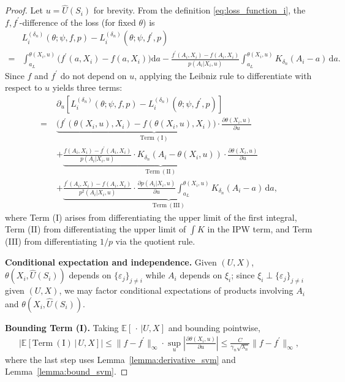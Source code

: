\documentclass[12pt]{article}
\newcommand{\E}{\mathbb{E}}
\begin{document}
\begin{proof}
Let $u = \widehat{U}(S_i)$ for brevity.  From the definition \eqref{eq:loss_function_i}, the $f,f^\prime$-difference of the loss (for fixed $\theta$) is
\begin{align*}
&L^{(\delta_n)}_i(\theta;\psi,f,p) - L^{(\delta_n)}_i(\theta;\psi,f^\prime,p)\\
= &\int_{a_L}^{\theta(X_i,u)}\bigl(f^\prime(a,X_i)-f(a,X_i)\bigr)\mathrm{d}a
- \frac{f^\prime(A_i,X_i)-f(A_i,X_i)}{p(A_i|X_i,u)}\int_{a_L}^{\theta(X_i,u)}K_{\delta_n}(A_i-a)\,\mathrm{d}a.
\end{align*}
Since $f$ and $f^\prime$ do not depend on $u$, applying the Leibniz rule to differentiate with respect to $u$ yields three terms:
\begin{align*}
&\partial_u\!\left[L^{(\delta_n)}_i(\theta;\psi,f,p) - L^{(\delta_n)}_i(\theta;\psi,f^\prime,p)\right]\\
=\;&\underbrace{\bigl(f^\prime(\theta(X_i,u),X_i)-f(\theta(X_i,u),X_i)\bigr)\cdot\frac{\partial\theta(X_i,u)}{\partial u}}_{\mathrm{Term\ (I)}}\\
&+\underbrace{\frac{f(A_i,X_i)-f^\prime(A_i,X_i)}{p(A_i|X_i,u)}\cdot K_{\delta_n}\!\left(A_i-\theta(X_i,u)\right)\cdot\frac{\partial\theta(X_i,u)}{\partial u}}_{\mathrm{Term\ (II)}}\\
&+\underbrace{\frac{f^\prime(A_i,X_i)-f(A_i,X_i)}{p^2(A_i|X_i,u)}\cdot\frac{\partial p(A_i|X_i,u)}{\partial u}\int_{a_L}^{\theta(X_i,u)}K_{\delta_n}(A_i-a)\,\mathrm{d}a}_{\mathrm{Term\ (III)}},
\end{align*}
where Term (I) arises from differentiating the upper limit of the first integral, Term (II) from differentiating the upper limit of $\int K$ in the IPW term, and Term (III) from differentiating $1/p$ via the quotient rule.

\noindent\textbf{Conditional expectation and independence.}
Given $(U,X)$, $\theta(X_i,\widehat{U}(S_i))$ depends on $\{\varepsilon_j\}_{j\neq i}$ while $A_i$ depends on $\xi_i$; since $\xi_i\perp\{\varepsilon_j\}_{j\neq i}$ given $(U,X)$, we may factor conditional expectations of products involving $A_i$ and $\theta(X_i,\widehat{U}(S_i))$.

\noindent\textbf{Bounding Term (I).}
Taking $\E[\,\cdot\,|U,X]$ and bounding pointwise,
\begin{align*}
\left|\E\!\left[\mathrm{Term\ (I)}\,\big|\,U,X\right]\right|
\leq \|f-f^\prime\|_\infty\cdot\sup_u\left|\frac{\partial\theta(X_i,u)}{\partial u}\right|
\leq \frac{C}{\gamma_n\sqrt{\lambda_n}}\|f-f^\prime\|_\infty,
\end{align*}
where the last step uses Lemma~\ref{lemma:derivative_svm} and Lemma~\ref{lemma:bound_svm}.


\end{proof}
\end{document}
